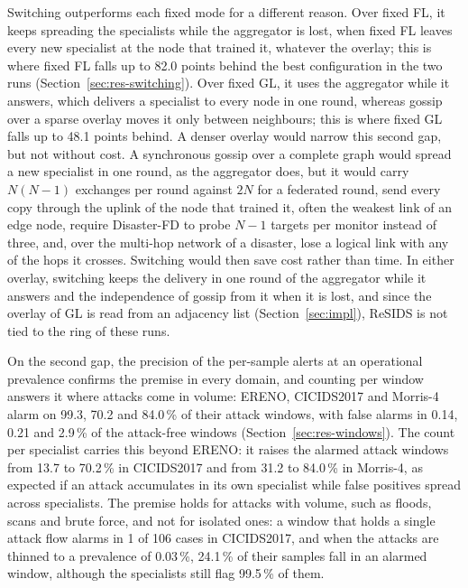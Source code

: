 Switching outperforms each fixed mode for a different reason. Over fixed FL, it keeps spreading the specialists while the aggregator is lost, when fixed FL leaves every new specialist at the node that trained it, whatever the overlay; this is where fixed FL falls up to 82.0 points behind the best configuration in the two runs (Section~\ref{sec:res-switching}). Over fixed GL, it uses the aggregator while it answers, which delivers a specialist to every node in one round, whereas gossip over a sparse overlay moves it only between neighbours; this is where fixed GL falls up to 48.1 points behind. A denser overlay would narrow this second gap, but not without cost. A synchronous gossip over a complete graph would spread a new specialist in one round, as the aggregator does, but it would carry $N(N-1)$ exchanges per round against $2N$ for a federated round, send every copy through the uplink of the node that trained it, often the weakest link of an edge node, require Disaster-FD to probe $N-1$ targets per monitor instead of three, and, over the multi-hop network of a disaster, lose a logical link with any of the hops it crosses. Switching would then save cost rather than time. In either overlay, switching keeps the delivery in one round of the aggregator while it answers and the independence of gossip from it when it is lost, and since the overlay of GL is read from an adjacency list (Section~\ref{sec:impl}), ReSIDS is not tied to the ring of these runs.

On the second gap, the precision of the per-sample alerts at an operational prevalence confirms the premise in every domain, and counting per window answers it where attacks come in volume: ERENO, CICIDS2017 and Morris-4 alarm on 99.3, 70.2 and 84.0\,\% of their attack windows, with false alarms in 0.14, 0.21 and 2.9\,\% of the attack-free windows (Section~\ref{sec:res-windows}). The count per specialist carries this beyond ERENO: it raises the alarmed attack windows from 13.7 to 70.2\,\% in CICIDS2017 and from 31.2 to 84.0\,\% in Morris-4, as expected if an attack accumulates in its own specialist while false positives spread across specialists. The premise holds for attacks with volume, such as floods, scans and brute force, and not for isolated ones: a window that holds a single attack flow alarms in 1 of 106 cases in CICIDS2017, and when the attacks are thinned to a prevalence of 0.03\,\%, 24.1\,\% of their samples fall in an alarmed window, although the specialists still flag 99.5\,\% of them.

